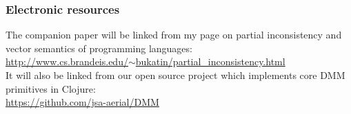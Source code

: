 \documentclass{beamer}
\begin{document}
\begin{frame}

  \frametitle{Electronic resources}

The companion paper will be linked from my page on partial inconsistency and vector semantics
of programming languages:\\[2ex]

\href{http://www.cs.brandeis.edu/~bukatin/partial\_inconsistency.html}{ http://www.cs.brandeis.edu/$\sim$bukatin/partial\_inconsistency.html}\\[2ex]

It will also be linked from our open source project which implements core DMM primitives in Clojure:\\[2ex]

\href{https://github.com/jsa-aerial/DMM}{https://github.com/jsa-aerial/DMM}

\end{frame}
\end{document}
